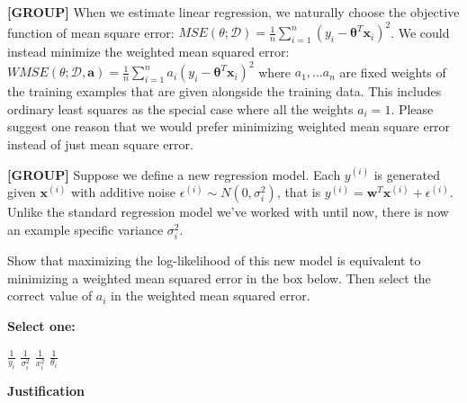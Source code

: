 \documentclass[11pt,addpoints,answers]{exam}
\newcommand{\Dc}{\mathcal{D}}
\newcommand{\av}{\mathbf{a}}
\newcommand{\group}{\textbf{[GROUP]} }
\begin{document}
\begin{questions}
    \question[2]\group When we estimate linear regression, we naturally choose the objective function of mean square error: 
    $MSE(\theta; \Dc)=\frac{1}{n} \sum_{i=1}^n (y_i - \mathbf{\theta}^T\mathbf{x}_i)^2$.
    We could instead minimize the weighted mean squared error: $WMSE(\theta; \Dc, \av)=\frac{1}{n} \sum_{i=1}^n a_i(y_i - \mathbf{\theta}^T\mathbf{x}_i)^2$ where $a_1, ... a_n$ are fixed weights of the training examples that are given alongside the training data. This includes ordinary least squares as the special case where all the weights $a_i=1$. Please suggest one reason that we would prefer minimizing weighted mean square error instead of just mean square error.
    
    
    \begin{your_solution}[title=Your answer,height=10cm,width=15cm]
    \end{your_solution}
    
    
    \question[4]\group Suppose we define a new regression model. Each $y^{(i)}$ is generated given $\mathbf{x}^{(i)}$ with additive noise $\epsilon^{(i)} \sim N(0, \sigma_i^2)$, that is $y^{(i)} = \mathbf{w}^T \mathbf{x}^{(i)} + \epsilon^{(i)}$. Unlike the standard regression model we've worked with until now, there is now an example specific variance $\sigma_i^2$.
    
    Show that maximizing the log-likelihood of this new model is equivalent to minimizing a weighted mean squared error in the box below. Then select the correct value of $a_i$ in the weighted mean squared error.
    
    \textbf{Select one:}
    \begin{checkboxes}
        \choice $\frac{1}{y_i}$
        \choice $\frac{1}{\sigma_i^2}$
        \choice $\frac{1}{x_i^2}$
        \choice $\frac{1}{\theta_i}$
    \end{checkboxes}
    \textbf{Justification}
    
    
    \begin{your_solution}[title=Justification,height=10cm,width=15cm]
    \end{your_solution}

\end{questions}

\clearpage
\end{document}
